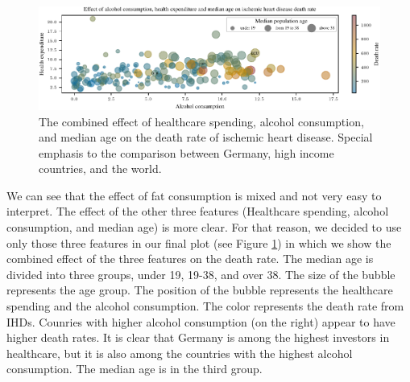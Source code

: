 \begin{figure}[ht]
    \vskip 0.2in
    \centering
    \centerline{\includegraphics[]{fig/fig_bubble_plot_factors.pdf}}
    \caption{The combined effect of healthcare spending, alcohol consumption, and median age on the death rate of ischemic heart disease. Special 
        emphasis to the comparison between Germany, high income countries, and the world.}
    \label{bubble_plot_factors}
\end{figure}

We can see that the effect of fat consumption is mixed and not very easy to interpret. The effect of the other three features 
(Healthcare spending, alcohol consumption, and median age) is more clear. For that reason, we decided to use only those three features in our final plot 
(see Figure \ref{bubble_plot_factors}) in which we show the combined effect of the three features on the death rate. The median age is divided into three groups, under 19, 19-38, and over 38. The size of the bubble represents the age group. The position of the bubble represents the healthcare spending and the alcohol consumption. The color represents the death rate from IHDs.
Counries with higher alcohol consumption (on the right) appear to have higher death rates.
It is clear that Germany is among the highest investors in healthcare, but it is also among the countries with the highest alcohol consumption. The median age is in the third group.

